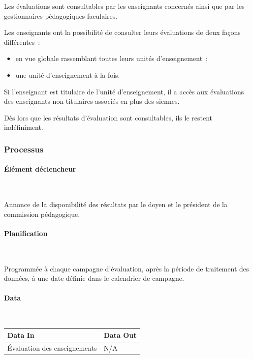 \documentclass[a4paper,11pt]{report}
\begin{document}
Les évaluations sont consultables par les enseignants concernés ainsi que par les gestionnaires pédagogiques faculaires.

Les enseignants ont la possibilité de consulter leurs évaluations de deux façons différentes~:
\begin{itemize}
	\item en vue globale rassemblant toutes leurs unités d'enseignement~;
	\item une unité d'enseignement à la fois.
\end{itemize}

Si l'enseignant est titulaire de l'unité d'enseignement, il a accès aux évaluations des enseignants non-titulaires associés en plus des siennes.

Dès lors que les résultats d'évaluation sont consultables, ils le restent indéfiniment.

\subsubsection{Processus}
\paragraph{Élément déclencheur}~\newline{}

Annonce de la disponibilité des résultats par le doyen et le président de la commission pédagogique.

\paragraph{Planification}~\newline{}

Programmée à chaque campagne d'évaluation, après la période de traitement des données, à une date définie dans le calendrier de campagne.

\paragraph{Data}~\newline{}

\begin{tabularx}{\linewidth}{|X|X|} \hline
Data In & Data Out \\ \hline
Évaluation des enseignements & N/A \\ \hline
\end{tabularx}
\end{document}
